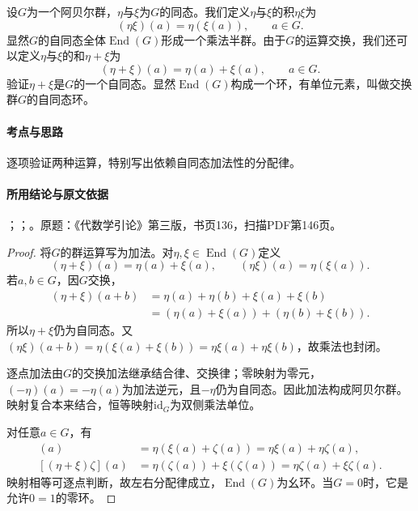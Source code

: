 设$G$为一个阿贝尔群，$\eta$与$\xi$为$G$的同态。我们定义$\eta$与$\xi$的积$\eta\xi$为
\[
(\eta\xi)(a)=\eta(\xi(a)),\qquad a\in G.
\]
显然$G$的自同态全体$\operatorname{End}(G)$形成一个乘法半群。由于$G$的运算交换，我们还可以定义$\eta$与$\xi$的和$\eta+\xi$为
\[
(\eta+\xi)(a)=\eta(a)+\xi(a),\qquad a\in G.
\]
验证$\eta+\xi$是$G$的一个自同态。显然$\operatorname{End}(G)$构成一个环，有单位元素，叫做交换群$G$的自同态环。

\paragraph{考点与思路}

逐项验证两种运算，特别写出依赖自同态加法性的分配律。

\paragraph{所用结论与原文依据}

；；。原题：《代数学引论》第三版，书页136，扫描PDF第146页。


\begin{proof}

将$G$的群运算写为加法。对$\eta,\xi\in\operatorname{End}(G)$定义
\[
(\eta+\xi)(a)=\eta(a)+\xi(a),\qquad
(\eta\xi)(a)=\eta(\xi(a)).
\]
若$a,b\in G$，因$G$交换，
\begin{align*}
(\eta+\xi)(a+b)
&=\eta(a)+\eta(b)+\xi(a)+\xi(b)\\
&=(\eta(a)+\xi(a))+(\eta(b)+\xi(b)).
\end{align*}
所以$\eta+\xi$仍为自同态。又$(\eta\xi)(a+b)=\eta(\xi(a)+\xi(b))=\eta\xi(a)+\eta\xi(b)$，故乘法也封闭。

逐点加法由$G$的交换加法继承结合律、交换律；零映射为零元，$(-\eta)(a)=-\eta(a)$为加法逆元，且$-\eta$仍为自同态。因此加法构成阿贝尔群。映射复合本来结合，恒等映射$\mathrm{id}_G$为双侧乘法单位。

对任意$a\in G$，有
\begin{align*}
[\eta(\xi+\zeta)](a)
&=\eta(\xi(a)+\zeta(a))=\eta\xi(a)+\eta\zeta(a),\\
[(\eta+\xi)\zeta](a)
&=\eta(\zeta(a))+\xi(\zeta(a))=\eta\zeta(a)+\xi\zeta(a).
\end{align*}
映射相等可逐点判断，故左右分配律成立，$\operatorname{End}(G)$为幺环。当$G=0$时，它是允许$0=1$的零环。

\end{proof}

